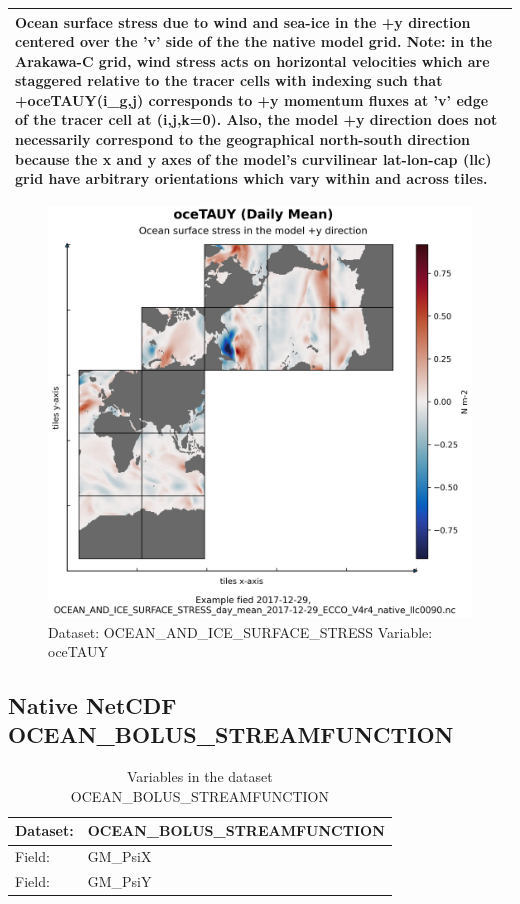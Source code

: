 \begin{longtable}{|m{}|m{}|m{}|m{}|}
\multicolumn{4}{|p{1\textwidth}|}{Ocean surface stress due to wind and sea-ice in the +y direction centered over the 'v' side of the the native model grid. Note: in the Arakawa-C grid, wind stress acts on horizontal velocities which are staggered relative to the tracer cells with indexing such that +oceTAUY(i\_g,j) corresponds to +y momentum fluxes at 'v' edge of the tracer cell at (i,j,k=0). Also, the model +y direction does not necessarily correspond to the geographical north-south direction because the x and y axes of the model's curvilinear lat-lon-cap (llc) grid have arbitrary orientations which vary within and across tiles.} \\ \hline
\end{longtable}

\begin{figure}[H]
\centering
\includegraphics[scale=0.55]{../images/plots/native_plots/Ocean_and_Sea-Ice_Surface_Stress/oceTAUY.png}
\caption{Dataset: OCEAN\_AND\_ICE\_SURFACE\_STRESS Variable: oceTAUY}
\label{tab:table-OCEAN_AND_ICE_SURFACE_STRESS_oceTAUY-Plot}
\end{figure}
\pagebreak
\subsection{Native NetCDF OCEAN\_BOLUS\_STREAMFUNCTION}
\newp
\begin{longtable}{|p{}|p{}|}
\caption{Variables in the dataset OCEAN\_BOLUS\_STREAMFUNCTION}
\label{tab:table-OCEAN_BOLUS_STREAMFUNCTION-fields} \\ 
\hline \endhead \hline \endfoot
\rowcolor{lightgray} \textbf{Dataset:} & \textbf{OCEAN\_BOLUS\_STREAMFUNCTION} \\ \hline
Field: &GM\_PsiX \\ \hline
Field: &GM\_PsiY \\ \hline
\end{longtable}

